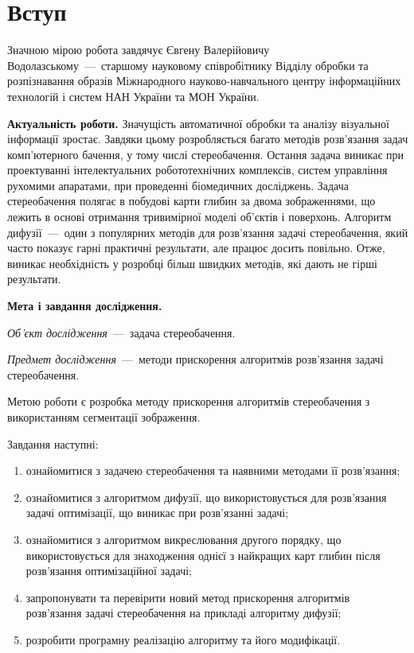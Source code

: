 \chapter*{Вступ}

Значною мірою робота завдячує Євгену Валерійовичу Водолазському~---~старшому
науковому співробітнику Відділу обробки та розпізнавання образів
Міжнародного науково-навчального центру інформаційних технологій
і систем НАН України та МОН України.

\textbf{Актуальність роботи.}
Значущість автоматичної обробки та аналізу візуальної інформації зростає.
Завдяки цьому розробляється багато методів
розв'язання задач комп'ютерного бачення, у тому числі стереобачення.
Остання задача виникає при проектуванні інтелектуальних робототехнічних
комплексів, систем управління рухомими апаратами,
при проведенні біомедичних досліджень.
Задача стереобачення полягає в побудові карти глибин за двома зображеннями,
що лежить в основі отримання тривимірної моделі об'єктів і поверхонь.
Алгоритм дифузії~---~один з популярних методів для розв'язання задачі
стереобачення, який часто показує гарні практичні результати,
але працює досить повільно.
Отже, виникає необхідність у розробці більш швидких методів,
які дають не гірші результати.

\textbf{Мета і завдання дослідження.}

\textit{Об'єкт дослідження}~---~задача стереобачення.

\textit{Предмет дослідження}~---~методи прискорення алгоритмів
розв'язання задачі стереобачення.

Метою роботи є розробка методу прискорення алгоритмів стереобачення
з використанням сегментації зображення.

Завдання наступні:
\begin{enumerate}
  \item
    ознайомитися з задачею стереобачення та наявними методами її розв'язання;
  \item
    ознайомитися з алгоритмом дифузії,
    що використовується для розв'язання задачі оптимізації,
    що виникає при розв'язанні задачі;
  \item
    ознайомитися з алгоритмом викреслювання другого порядку,
    що використовується для знаходження однієї з найкращих карт глибин
    після розв'язання оптимізаційної задачі;
  \item
    запропонувати та перевірити новий метод прискорення
    алгоритмів розв'язання задачі стереобачення на прикладі алгоритму дифузії;
  \item
    розробити програмну реалізацію алгоритму та його модифікації.
\end{enumerate}

